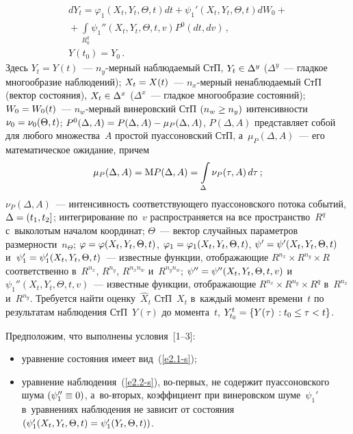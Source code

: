 \begin{multicols}{2}
    \noindent
    \begin{multline}
        dY_t =\varphi_1 \left(X_t,Y_t,\Theta, t\right) dt +
    \psi_1' \left(X_t,Y_t,\Theta, t\right) dW_0 + {}\\
{}+\int\limits_{R_0^q} \psi_1'' (X_t,Y_t,\Theta, t,v) P^0
    (dt,dv)\,,\\
     Y(t_0) = Y_0\,.
    \label{e2.2-s}
    \end{multline}
Здесь $Y_t=Y(t)$~--- $n_y$-мер\-ный наблюдаемый
СтП, $Y_t \hm\in \Delta^y$ ($\Delta^y$~--- гладкое многообразие наблюдений);
 $X_t \hm=X(t)$~--- $n_x$-мер\-ный ненаблюдаемый
СтП (вектор состояния), $X_t \hm\in \Delta^x$ ($\Delta^x$~--- 
гладкое многообразие состояний); $W_0\hm =W_0(t)$~--- $n_w$-мер\-ный
винеровский СтП $(n_w\hm\ge n_y)$ интенсивности  $\nu_0 \hm=\nu_0 (\Theta, t)$; 
$P^0(\Delta,A)\hm=P(\Delta,A)\hm-\mu_P (\Delta,A)$, $P(\Delta,A)$  представляет 
собой для любого множества~$A$ прос\-той пуассоновский СтП, а~$\mu_P (\Delta,A)$~--- 
его математическое ожидание, причем
    $$
    \mu_P (\Delta,A)={\rm M} P (\Delta,A)=\int\limits_\Delta \nu_P(\tau, A)\, d\tau\,;
    $$
$\nu_P (\Delta, A)$~--- интенсивность соответствующего пуассоновского потока событий, 
$\Delta \hm=(t_1,t_2]$; интегрирование по~$v$ распространяется на все 
пространство~$R^q$ с~выколотым началом координат; $\Theta$~--- 
вектор случайных параметров размерности~$n_\Theta$;
$\varphi\hm=\varphi(X_t,Y_t,\Theta, t)$, $\varphi_1\hm=\varphi_1(X_t,Y_t,\Theta, t)$,
 $\psi'\hm=\psi'(X_t,Y_t,\Theta, t)$ и~$\psi_1'\hm=\psi_1'(X_t,Y_t,\Theta, t)$~--- 
 известные функции, отображающие
$R^{n_x}\times R^{n_y}\times  R$ соответст\-венно в~$R^{n_x}$,
$R^{n_y}$, $R^{n_xn_w}$ и~$R^{n_yn_w}$; $\psi''\hm=\psi''(X_t,Y_t,\Theta, t,v)$ 
и~$\psi_1''(X_t,Y_t,\Theta, t,v)$~--- известные
функции, отображающие $R^{n_x}\times R^{n_y}\times R^q$ 
в~$R^{n_x}$ и~$R^{n_y}$. Требуется найти оценку~$\hat X_t$ СтП~$X_t$ 
в~каж\-дый момент времени~$t$ по результатам наблюдения
СтП~$Y(\tau)$ до момента~$t$, $Y_{t_0}^t \hm=  \{ Y(\tau) \,: t_0 \hm\le \tau\hm< t\}$.

Предположим, что выполнены условия~[1--3]:
\begin{itemize}
\item  уравнение состояния имеет вид~(\ref{e2.1-s});

\item уравнение наблюдения~(\ref{e2.2-s}), во-пер\-вых, не содержит
пуассоновского шума $(\psi_1'' \hm\equiv 0)$, а~во-вто\-рых, 
коэффициент при винеровском шуме~$\psi_1'$  в~уравнениях наблюдения не зависит 
от со\-сто\-яния $(\psi_1' (X_t, Y_t,\Theta, t)\hm =\psi_1'(Y_t,\Theta, t))$.
\end{itemize}


\end{multicols}
